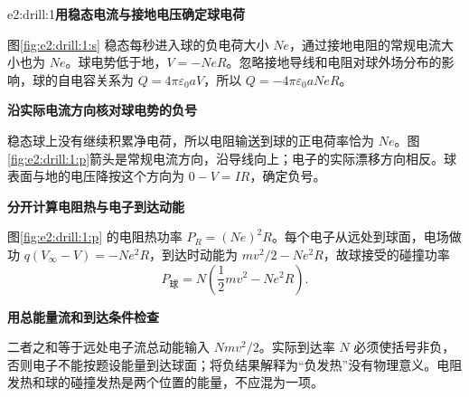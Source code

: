 \LectureAnswerSection

\begin{drillsolution}{e2:drill:1}\textbf{用稳态电流与接地电压确定球电荷}\par\nobreak
图\ref{fig:e2:drill:1:s} 稳态每秒进入球的负电荷大小 $Ne$，通过接地电阻的常规电流大小也为 $Ne$。球电势低于地，$V=-NeR$。忽略接地导线和电阻对球外场分布的影响，球的自电容关系为 $Q=4\pi\varepsilon_0aV$，所以 $Q=-4\pi\varepsilon_0aNeR$。



\par\medskip{}\noindent\textbf{沿实际电流方向核对球电势的负号}\par\nobreak
稳态球上没有继续积累净电荷，所以电阻输送到球的正电荷率恰为 $Ne$。图\ref{fig:e2:drill:1:p}箭头是常规电流方向，沿导线向上；电子的实际漂移方向相反。球表面与地的电压降按这个方向为 $0-V=IR$，确定负号。



\par\medskip{}\noindent\textbf{分开计算电阻热与电子到达动能}\par\nobreak
图\ref{fig:e2:drill:1:p} 的电阻热功率 $P_R=(Ne)^2R$。每个电子从远处到球面，电场做功 $q(V_\infty-V)=-Ne^2R$，到达时动能为 $mv^2/2-Ne^2R$，故球接受的碰撞功率
\[
 P_{\text{球}}=N\left(\frac12mv^2-Ne^2R\right).
\]


\par\medskip{}\noindent\textbf{用总能量流和到达条件检查}\par\nobreak
二者之和等于远处电子流总动能输入 $Nmv^2/2$。实际到达率 $N$ 必须使括号非负，否则电子不能按题设能量到达球面；将负结果解释为“负发热”没有物理意义。电阻发热和球的碰撞发热是两个位置的能量，不应混为一项。\end{drillsolution}

